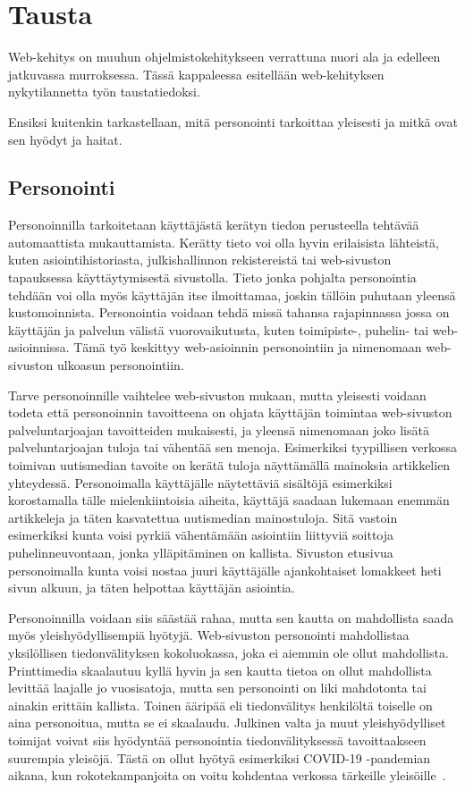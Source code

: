 \documentclass[finnish, 12pt, a4paper, elec, utf8, a-1b, online]{aaltothesis}
\begin{document}
\clearpage

\section{Tausta}

Web-kehitys on muuhun ohjelmistokehitykseen verrattuna nuori ala ja
edelleen jatkuvassa murroksessa. Tässä kappaleessa esitellään web-kehityksen
nykytilannetta työn taustatiedoksi.

Ensiksi kuitenkin tarkastellaan, mitä personointi tarkoittaa yleisesti ja mitkä
ovat sen hyödyt ja haitat.

\subsection{Personointi}

Personoinnilla tarkoitetaan käyttäjästä kerätyn tiedon perusteella tehtävää
automaattista mukauttamista. Kerätty tieto voi olla hyvin erilaisista lähteistä,
kuten asiointihistoriasta, julkishallinnon rekistereistä tai web-sivuston
tapauksessa käyttäytymisestä sivustolla. Tieto jonka pohjalta personointia
tehdään voi olla myös käyttäjän itse ilmoittamaa, joskin tällöin puhutaan
yleensä kustomoinnista. Personointia voidaan tehdä missä tahansa rajapinnassa
jossa on käyttäjän ja palvelun välistä vuorovaikutusta, kuten toimipiste-,
puhelin- tai web-asioinnissa. Tämä työ keskittyy web-asioinnin personointiin
ja nimenomaan web-sivuston ulkoasun personointiin.

Tarve personoinnille vaihtelee web-sivuston mukaan, mutta yleisesti voidaan
todeta että personoinnin tavoitteena on ohjata käyttäjän toimintaa web-sivuston
palveluntarjoajan tavoitteiden mukaisesti, ja yleensä nimenomaan joko lisätä
palveluntarjoajan tuloja tai vähentää sen menoja. Esimerkiksi tyypillisen
verkossa toimivan uutismedian tavoite on kerätä tuloja näyttämällä mainoksia
artikkelien yhteydessä. Personoimalla käyttäjälle näytettäviä sisältöjä
esimerkiksi korostamalla tälle mielenkiintoisia aiheita, käyttäjä saadaan
lukemaan enemmän artikkeleja ja täten kasvatettua uutismedian mainostuloja. Sitä
vastoin esimerkiksi kunta voisi pyrkiä vähentämään asiointiin liittyviä soittoja
puhelinneuvontaan, jonka ylläpitäminen on kallista. Sivuston etusivua
personoimalla kunta voisi nostaa juuri käyttäjälle ajankohtaiset lomakkeet heti
sivun alkuun, ja täten helpottaa käyttäjän asiointia.

Personoinnilla voidaan siis säästää rahaa, mutta sen kautta on mahdollista saada
myös yleishyödyllisempiä hyötyjä. Web-sivuston personointi mahdollistaa
yksilöllisen tiedonvälityksen kokoluokassa, joka ei aiemmin ole ollut
mahdollista. Printtimedia skaalautuu kyllä hyvin ja sen kautta tietoa on ollut
mahdollista levittää laajalle jo vuosisatoja, mutta sen personointi on liki
mahdotonta tai ainakin erittäin kallista. Toinen ääripää eli tiedonvälitys
henkilöltä toiselle on aina personoitua, mutta se ei skaalaudu. Julkinen valta
ja muut yleishyödylliset toimijat voivat siis hyödyntää personointia
tiedonvälityksessä tavoittaakseen suurempia yleisöjä. Tästä on ollut hyötyä
esimerkiksi COVID-19 -pandemian aikana, kun rokotekampanjoita on voitu kohdentaa
verkossa tärkeille yleisöille~\cite{viite?}.
\end{document}
